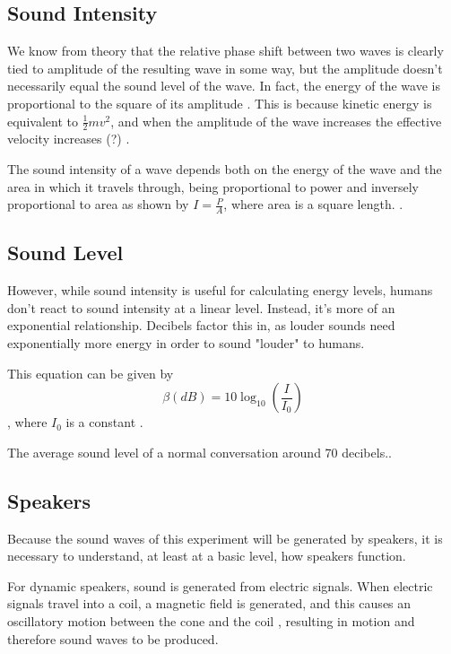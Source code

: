 \documentclass[index]{subfiles}
\begin{document}
\subsection{Sound Intensity}

We know from theory that the relative phase shift between two waves is clearly tied to amplitude of the resulting wave in some way, but the amplitude doesn't necessarily equal the sound level of the wave. In fact, the energy of the wave is proportional to the square of its amplitude \cite{openstax}. This is because kinetic energy is equivalent to \(\frac{1}{2}mv^{2}\), and when the amplitude of the wave increases the effective velocity increases (?) \cite{openstax}.

The sound intensity of a wave depends both on the energy of the wave and the area in which it travels through, being proportional to power and inversely proportional to area as shown by \(I=\frac{P}{A}\), where area is a square length. \cite{openstax}.

\subsection{Sound Level}

However, while sound intensity is useful for calculating energy levels, humans don't react to sound intensity at a linear level. Instead, it's more of an exponential relationship. Decibels factor this in, as louder sounds need exponentially more energy in order to sound "louder" to humans.

This equation can be given by
$$
    \beta\left(dB\right)=10\log_{10}\left(\frac{I}{I_{0}}\right)
$$, where \(I_{0}\) is a constant \cite{openstax}.

The average sound level of a normal conversation around 70 decibels.\cite{speakers}.

\subsection{Speakers}

Because the sound waves of this experiment will be generated by speakers, it is necessary to understand, at least at a basic level, how speakers function. \cite{speakers}

For dynamic speakers, sound is generated from electric signals. When electric signals travel into a coil, a magnetic field is generated, and this causes an oscillatory motion between the cone and the coil \cite{openstax} \cite{speakers}, resulting in motion and therefore sound waves to be produced.
\end{document}
